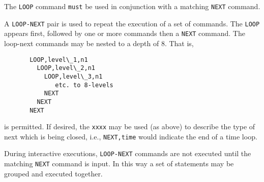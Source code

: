 \headb

The {\tt LOOP} command {\tt must} be used in conjunction
with a matching {\tt NEXT} command.

A {\tt LOOP-NEXT} pair is used to
repeat the execution of a set of commands.  The {\tt LOOP}
appears first, followed by one or more commands then
a {\tt NEXT} command.  The loop-next commands may be
nested to a depth of 8.  That is,
\begin{verbatim}
       LOOP,level\_1,n1
         LOOP,level\_2,n1
           LOOP,level\_3,n1
              etc. to 8-levels
           NEXT
         NEXT
       NEXT
\end{verbatim}
is permitted.
If desired, the {\tt xxxx} may be used (as above)
to describe the type of next which is being closed, i.e.,
{\tt NEXT,time} would indicate the end of a time loop.

During interactive executions, {\tt LOOP-NEXT} commands
are not executed until the matching {\tt NEXT} command is input.
In this way a set of statements may be grouped and executed together.
\vfill\eject
